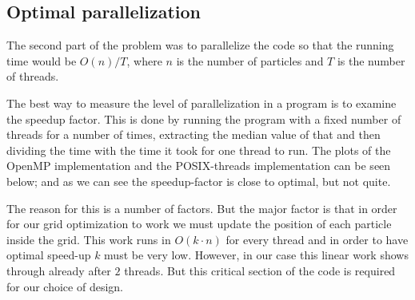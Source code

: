 \subsection{Optimal parallelization}

The second part of the problem was to parallelize the code so that the running
time would be $O(n) / T$, where $n$ is the number of particles and $T$ is the
number of threads.

The best way to measure the level of parallelization in a program is to examine
the speedup factor. This is done by running the program with a fixed number of
threads for a number of times, extracting the median value of that and then
dividing the time with the time it took for one thread to run. The plots of the
OpenMP implementation and the POSIX-threads implementation can be seen below;
and as we can see the speedup-factor is close to optimal, but not quite.

The reason for this is a number of factors. But the major factor is that in
order for our grid optimization to work we must update the position of each
particle inside the grid. This work runs in $O(k \cdot n)$ for every thread and
in order to have optimal speed-up $k$ must be very low. However, in our case
this linear work shows through already after $2$ threads. But this critical
section of the code is required for our choice of design.

